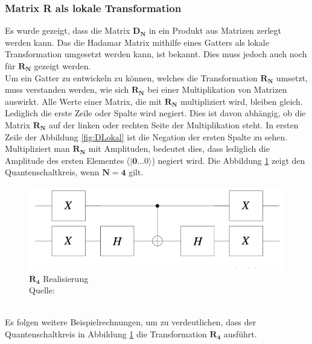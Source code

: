 \subsubsection{Matrix R als lokale Transformation}
Es wurde gezeigt, dass die Matrix $\mathbf{D_N}$ in ein Produkt aus Matrizen zerlegt werden kann. Das die Hadamar Matrix mithilfe eines Gatters als lokale Transformation umgesetzt werden kann, ist bekannt. Dies muss jedoch auch noch für $\mathbf{R_N}$ gezeigt werden. 
\\
Um ein Gatter zu entwickeln zu können, welches die Transformation $\mathbf{R_N}$ umsetzt, muss verstanden werden, wie sich $\mathbf{R_N}$ bei einer Multiplikation von Matrizen auswirkt. Alle Werte einer Matrix, die mit $\mathbf{R_N}$ multipliziert wird, bleiben gleich. Lediglich die erste Zeile oder Spalte wird negiert. Dies ist davon abhängig, ob die Matrix $\mathbf{R_N}$ auf der linken oder rechten Seite der Multiplikation steht. In ersten Zeile der Abbildung \ref{fig:DLokal} ist die Negation der ersten Spalte zu sehen.
\\
Multipliziert man $\mathbf{R_N}$ mit Amplituden, bedeutet dies, dass lediglich die Amplitude des ersten Elementes ($\mathbf{|0...0\rangle}$) negiert wird.
Die Abbildung \ref{fig:Rgatter} zeigt den Quantenschaltkreis, wenn $\mathbf{N = 4}$ gilt.
 \begin{figure}[hbtp]
 	\centering
 	\includegraphics[width=.8\textwidth]{figures/rgatter.png}
 	\caption{$\mathbf{R_4}$ Realisierung \\ Quelle: \cite[S. 145]{Ho17}}
 	\label{fig:Rgatter}
 \end{figure}
\\
Es folgen weitere Beispielrechnungen, um zu verdeutlichen, dass der Quantenschaltkreis in Abbildung \ref{fig:Rgatter} die Transformation $\mathbf{R_4}$ ausführt.
